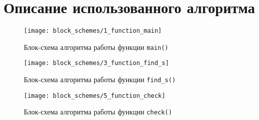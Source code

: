 \section{Описание использованного алгоритма}

\begin{figure}[H]
  \centering
  \texttt{[image: block\_schemes/1\_function\_main]}
  \caption{Блок-схема алгоритма работы функции \texttt{main()}}
\end{figure}

\begin{figure}[H]
  \centering
  \texttt{[image: block\_schemes/3\_function\_find\_s]}
  \caption{Блок-схема алгоритма работы функции \texttt{find\_s()}}
\end{figure}

\begin{figure}[H]
  \centering
  \texttt{[image: block\_schemes/5\_function\_check]}
  \caption{Блок-схема алгоритма работы функции \texttt{check()}}
\end{figure}

